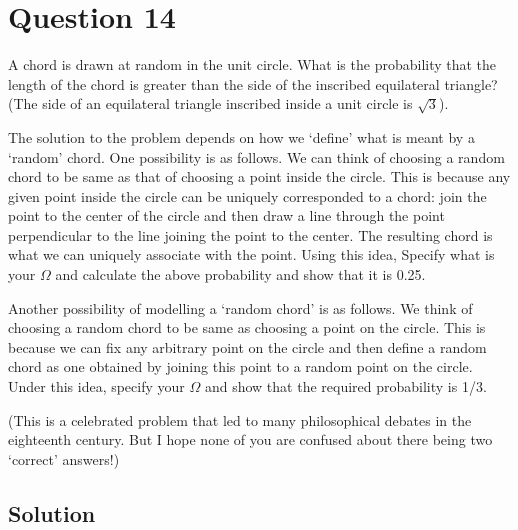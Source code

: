 \section*{Question 14}

A chord is drawn at random in the unit circle. What is the probability that the length of the chord is greater than the side of the inscribed equilateral triangle?\\
(The side of an equilateral triangle inscribed inside a unit circle is \( \sqrt{3} \)).

The solution to the problem depends on how we `define' what is meant by a `random' chord.
One possibility is as follows.
We can think of choosing a random chord to be same as that of choosing a point inside the circle.
This is because any given point inside the circle can be uniquely corresponded to a chord: join the point to the center of the circle and then draw a line through the point perpendicular to the line joining the point to the center.
The resulting chord is what we can uniquely associate with the point.
Using this idea, Specify what is your \( \Omega \) and calculate the above probability and show that it is 0.25.

Another possibility of modelling a `random chord' is as follows.
We think of choosing a random chord to be same as choosing a point on the circle.
This is because we can fix any arbitrary point on the circle and then define a random chord as one obtained by joining this point to a random point on the circle.
Under this idea, specify your \( \Omega \) and show that the required probability is 1/3.

(This is a celebrated problem that led to many philosophical debates in the eighteenth century. But I hope none of you are confused about there being two `correct' answers!)

\subsection*{Solution}
